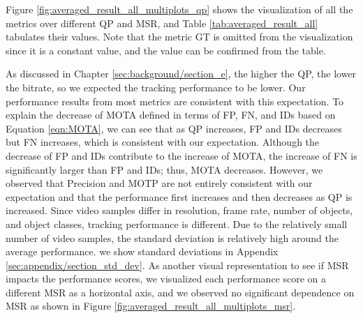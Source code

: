 Figure \ref{fig:averaged_result_all_multiplots_qp} shows the visualization of all the metrics over different QP and MSR, and Table \ref{tab:averaged_result_all} tabulates their values. Note that the metric GT is omitted from the visualization since it is a constant value, and the value can be confirmed from the table. 


As discussed in Chapter \ref{sec:background/section_e}, the higher the QP, the lower the bitrate, so we expected the tracking performance to be lower. Our performance results from most metrics are consistent with this expectation. To explain the decrease of MOTA defined in terms of FP, FN, and IDs based on Equation \eqref{eqn:MOTA}, we can see that as QP increases, FP and IDs decreases but FN increases, which is consistent with our expectation. Although the decrease of FP and IDs contribute to the increase of MOTA, the increase of FN is significantly larger than FP and IDs; thus, MOTA decreases. However, we observed that Precision and MOTP are not entirely consistent with our expectation and that the performance first increases and then decreases as QP is increased. Since video samples differ in resolution, frame rate, number of objects, and object classes, tracking performance is different. Due to the relatively small number of video samples, the standard deviation is relatively high around the average performance. we show standard deviations in Appendix \ref{sec:appendix/section_std_dev}. As another visual representation to see if MSR impacts the performance scores, we visualized each performance score on a different MSR as a horizontal axis, and we observed no significant dependence on MSR as shown in Figure \ref{fig:averaged_result_all_multiplots_msr}.



